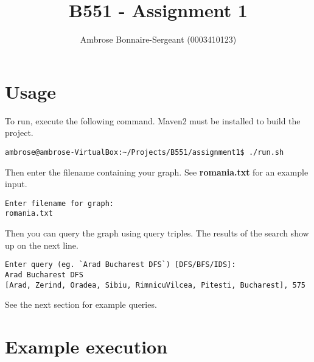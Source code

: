 \documentclass[10pt]{article}
\begin{document}
\title{B551 - Assignment 1}
\author{Ambrose Bonnaire-Sergeant (0003410123)}

\maketitle

\section{Usage}

To run, execute the following command. Maven2 must be installed to build the project.

\begin{verbatim}
ambrose@ambrose-VirtualBox:~/Projects/B551/assignment1$ ./run.sh
\end{verbatim}

Then enter the filename containing your graph. See \textbf{romania.txt} for an example input.

\begin{verbatim}
Enter filename for graph:
romania.txt
\end{verbatim}

Then you can query the graph using query triples. The results of the search show up on the next line.

\begin{verbatim}
Enter query (eg. `Arad Bucharest DFS`) [DFS/BFS/IDS]:
Arad Bucharest DFS
[Arad, Zerind, Oradea, Sibiu, RimnicuVilcea, Pitesti, Bucharest], 575
\end{verbatim}

See the next section for example queries.

\section{Example execution}
\end{document}
